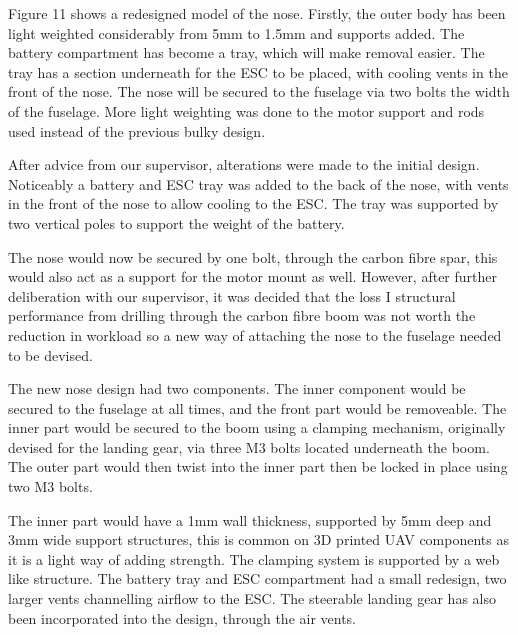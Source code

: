 \documentclass[../../main.tex]{subfiles}
\begin{document}
Figure 11 shows a redesigned model of the nose.
Firstly, the outer body has been light weighted considerably from 5mm to 1.5mm and supports added.
The battery compartment has become a tray, which will make removal easier.
The tray has a section underneath for the ESC to be placed, with cooling vents in the front of the nose.
The nose will be secured to the fuselage via two bolts the width of the fuselage.
More light weighting was done to the motor support and rods used instead of the previous bulky design. 


After advice from our supervisor, alterations were made to the initial design.
Noticeably a battery and ESC tray was added to the back of the nose, with vents in the front of the nose to allow cooling to the ESC.
The tray was supported by two vertical poles to support the weight of the battery. 


The nose would now be secured by one bolt, through the carbon fibre spar, this would also act as a support for the motor mount as well.
However, after further deliberation with our supervisor, it was decided that the loss I structural performance from drilling through the carbon fibre boom was not worth the reduction in workload so a new way of attaching the nose to the fuselage needed to be devised.  

The new nose design had two components.
The inner component would be secured to the fuselage at all times, and the front part would be removeable.
The inner part would be secured to the boom using a clamping mechanism, originally devised for the landing gear, via three M3 bolts located underneath the boom.
The outer part would then twist into the inner part then be locked in place using two M3 bolts. 


The inner part would have a 1mm wall thickness, supported by 5mm deep and 3mm wide support structures, this is common on 3D printed UAV components as it is a light way of adding strength.
The clamping system is supported by a web like structure.
The battery tray and ESC compartment had a small redesign, two larger vents channelling airflow to the ESC.
The steerable landing gear has also been incorporated into the design, through the air vents. 
\end{document}
